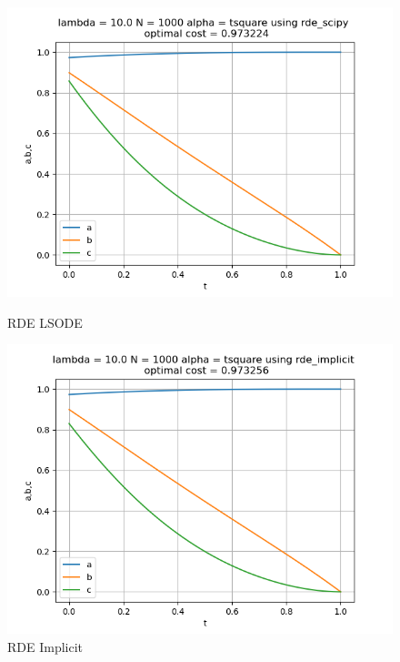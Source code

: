 \begin{figure}[H]
	\centering
	\begin{minipage}{0.3\textwidth}
		\centering
		\includegraphics[width=\linewidth]{rde_scipy_l10_alphat2.png}
		\caption{RDE LSODE}
	\end{minipage}
	\hfill
	\begin{minipage}{0.3\textwidth}
		\centering
		\includegraphics[width=\linewidth]{rde_implicit_l10_alphat2.png}
		\caption{RDE Implicit}
	\end{minipage}
	\hfill
	\begin{minipage}{0.3\textwidth}
		\centering

\end{minipage}
\end{figure}
